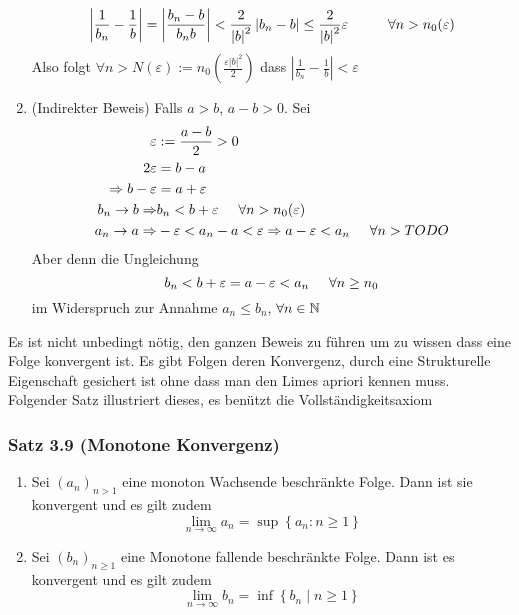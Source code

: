 \begin{beweis}{}
\begin{enumerate}[\hspace{2mm}i)]
\[\left| {\frac{1}{{{b_n}}} - \frac{1}{b}} \right| = \left| {\frac{{{b_n} - b}}{{{b_n}b}}} \right| < \frac{2}{{{{\left| b \right|}^2}}}\left| {{b_n} - b} \right| \le \frac{2}{{{{\left| b \right|}^2}}}\varepsilon \hspace{10mm}\forall n > {n_0}(\varepsilon )\]
Also folgt $\forall n > N(\varepsilon):=n_0\left( \frac{\varepsilon\left| b\right|^2}{2}\right)$ dass $\left| \frac{1}{b_n}-\frac{1}{b}\right| < \varepsilon$ 
\item (Indirekter Beweis) Falls $a>b$, $a-b>0$. Sei 
\begin{align*}
\varepsilon&:= \frac{a-b}{2}>0\\
2\varepsilon&= b-a\\
\Rightarrow b-\varepsilon&= a+\varepsilon\\
b_n\to b\Rightarrow&b_n < b+\varepsilon\hspace{5mm}\forall n>n_0(\varepsilon)\\
a_n\to a\Rightarrow&-\varepsilon < a_n -a<\varepsilon\Rightarrow a-\varepsilon < a_n\hspace{5mm}\forall n>TODO
\end{align*}
Aber denn die Ungleichung 
\[b_n < b+\varepsilon = a-\varepsilon < a_n\hspace{5mm}\forall n\geq n_0\]
im Widerspruch zur Annahme $a_n\leq b_n$, $\forall n\in\mathbb{N}$
\end{enumerate}
\end{beweis}
Es ist nicht unbedingt nötig, den ganzen Beweis zu führen um zu wissen dass eine Folge konvergent ist. Es gibt Folgen deren Konvergenz, durch eine Strukturelle Eigenschaft gesichert ist ohne dass man den Limes apriori kennen muss.\\

Folgender Satz illustriert dieses, es benützt die Vollständigkeitsaxiom
\subsubsection*{Satz 3.9 (Monotone Konvergenz)}
\begin{enumerate}
\item Sei $\left( a_n\right)_{n > 1}$ eine monoton Wachsende beschränkte Folge. Dann ist sie konvergent und es gilt zudem \[\mathop {\lim }\limits_{n \to \infty } {a_n} = \sup \left\{ {{a_n}:n \ge 1} \right\}\]
\item Sei $\left( b_n\right)_{n \geq 1}$ eine Monotone fallende beschränkte Folge. Dann ist es konvergent und es gilt zudem \[\mathop {\lim }\limits_{n \to \infty } {b_n} = \inf \left\{ {{b_n}\mid n \ge 1} \right\}\]
\end{enumerate}

